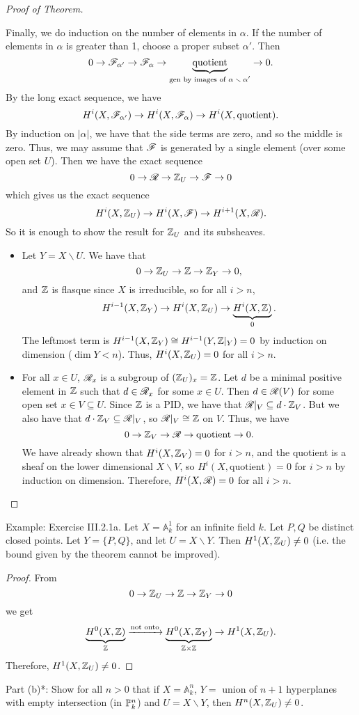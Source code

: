 \begin{proof}[Proof of Theorem]
\begin{itemize}
Finally, we do induction on the number of elements in $\alpha$. If
the number of elements in $\alpha$ is greater than 1, choose a
proper subset $\alpha'$. Then
\[
    0\to \F_{\alpha'} \to \F_{\alpha} \to
    \underbrace{\text{quotient}}_{\text{gen by images of
    $\alpha\smallsetminus \alpha'$}}\to 0.
\]
By the long exact sequence, we have
\[
    H^i(X,\F_{\alpha'})\to H^i(X,\F_{\alpha})\to
    H^i(X,\text{quotient}).
\]
By induction on $|\alpha|$, we have that the side terms are zero,
and so the middle is zero.  Thus, we may assume that $\F$ is
generated by a single element (over some open set $U$).  Then we
have the exact sequence
\[
    0\to \R \to \Z_U\to \F \to 0
\]
which gives us the exact sequence
\[
    H^i(X,\Z_U)\to H^i(X,\F)\to H^{i+1}(X,\R).
\]
So it is enough to show the result for $\Z_U$ and its subsheaves.
\begin{itemize}
\item[\underline{Proof for $\Z_U$}:] Let $Y=X\smallsetminus U$. We
have that
\[
    0\to \Z_U \to \Z \to \Z_Y\to 0,
\]
and $\Z$ is flasque since $X$ is irreducible, so for all $i>n$,
\[
    H^{i-1}(X,\Z_Y)\to H^i(X,\Z_U)\to \underbrace{H^i(X,\Z)}_0.
\]
The leftmost term is $H^{i-1}(X,\Z_Y)\cong H^{i-1}(Y,\Z|_Y)=0$ by
induction on dimension ($\dim Y<n$).  Thus, $H^i(X,\Z_U)=0$ for
all $i>n$.

\item[\underline{Proof for $\R$}:]
For all $x\in U$, $\R_x$ is a subgroup of $(\Z_U)_x = \Z$.  Let
$d$ be a minimal positive element in $\Z$ such that $d\in \R_x$
for some $x\in U$.  Then $d\in \R(V)$ for some open set $x\in
V\subseteq U$.  Since $\Z$ is a PID, we have that $\R|_V\subseteq
d\cdot \Z_V$.  But we also have that $d\cdot \Z_V\subseteq \R|_V$,
so $\R|_V\cong \Z$ on $V$.  Thus, we have
\[
    0\to \Z_V \to \R \to \text{quotient} \to 0.
\]
We have already shown that $H^i(X,\Z_V)=0$ for $i>n$, and the
quotient is a sheaf on the lower dimensional $X\smallsetminus V$,
so $H^i(X,\text{quotient})=0$ for $i>n$ by induction on dimension.
Therefore, $H^i(X,\R)=0$ for all $i>n$.
\end{itemize}
\end{itemize}
\end{proof}

Example: Exercise III.2.1a.  Let $X=\mathbb{A}^1_k$ for an
infinite field $k$.  Let $P,Q$ be distinct closed points.  Let
$Y=\{P,Q\}$, and let $U=X\smallsetminus Y$.  Then
$H^1(X,\Z_U)\not=0$ (i.e. the bound given by the theorem cannot be
improved).
\begin{proof}
From
\[
    0\to \Z_U\to \Z\to \Z_Y\to 0
\]
we get
\[
    \underbrace{H^0(X,\Z)}_{\Z} \xrightarrow{\text{not onto}}
    \underbrace{H^0(X,\Z_Y)}_{\Z\times\Z} \to H^1(X,\Z_U).
\]
Therefore, $H^1(X,\Z_U)\not=0$.
\end{proof}
Part (b)*: Show for all $n>0$ that if $X=\mathbb{A}^n_k$, $Y=$
union of $n+1$ hyperplanes with empty intersection (in $\P^n_k$)
and $U=X\smallsetminus Y$, then $H^n(X,\Z_U)\not=0$.

